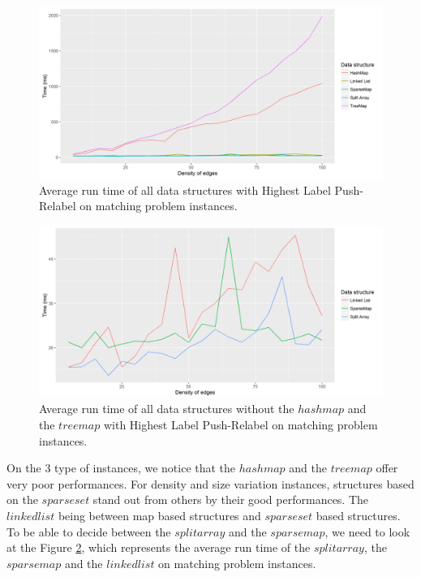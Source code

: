 \begin{figure}[H]
\begin{center}
\includegraphics[scale=0.6]{images/results/prmeanmatching.png}
\caption{Average run time of all data structures with Highest Label Push-Relabel on matching problem instances.}
\label{fig:prmeanmatching}
\end{center}
\end{figure}

\begin{figure}[H]
\begin{center}
\includegraphics[scale=0.55]{images/results/prmeanmatching2.png}
\caption{Average run time of all data structures without the $hashmap$ and the $treemap$ with Highest Label Push-Relabel on matching problem instances.}
\label{fig:prmeanmatching2}
\end{center}
\end{figure}
On the 3 type of instances, we notice that the $hashmap$ and the $treemap$ offer very poor performances. For density and size variation instances, structures based on the $sparse set$ stand out from others by their good performances. The $linked list$ being between map based structures and  $sparse set$ based structures. To be able to decide between the $split array$ and the $sparse map$, we need to look at the Figure \ref{fig:prmeanmatching2}, which represents the average run time of the $split array$, the $sparse map$ and the $linked list$ on matching problem instances.

